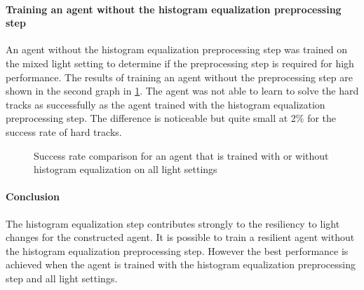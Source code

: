 \paragraph{Training an agent without the histogram equalization preprocessing step}
An agent without the histogram equalization preprocessing step was trained on the mixed light setting to determine if the preprocessing step is required for high performance. The results of training an agent without the preprocessing step are shown in the second graph in \ref{fig:hardDistance_mixedLight_noHistogramEqualizationTraining_results}. The agent was not able to learn to solve the hard tracks as successfully as the agent trained with the histogram equalization preprocessing step. The difference is noticeable but quite small at 2\% for the success rate of hard tracks.

\begin{figure}
    \centering
    \caption{Success rate comparison for an agent that is trained with or without histogram equalization on all light settings}
    \label{fig:hardDistance_mixedLight_noHistogramEqualizationTraining_results}
\end{figure}

\paragraph{Conclusion}
The histogram equalization step contributes strongly to the resiliency to light changes for the constructed agent. It is possible to train a resilient agent without the histogram equalization preprocessing step.
However the best performance is achieved when the agent is trained with the histogram equalization preprocessing step and all light settings.

